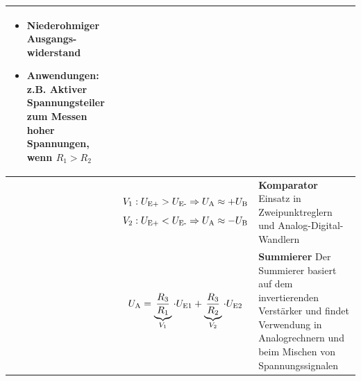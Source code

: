 \begin{table}[ht]
\begin{tabular}{|m{}|m{}|m{}|}
\begin{itemize}[leftmargin=0.4cm, parsep=0.0cm, itemsep=2pt, topsep=2pt]
            \item Niederohmiger Ausgangs-\linebreak widerstand
            \item Anwendungen: \linebreak z.B. Aktiver Spannungsteiler zum Messen hoher Spannungen, wenn $R_1 > R_2$
        \end{itemize}
        \\ %
        \hline
        \centering
        
                                                            &
        \begin{center}
            
            \[
                V_1: U_{\textnormal{E+}} > U_{\textnormal{E-}} \Rightarrow U_{\textnormal{A}} \approx +U_{\textnormal{B}}
            \]
            \[
                V_2: U_{\textnormal{E+}} < U_{\textnormal{E-}} \Rightarrow U_{\textnormal{A}} \approx -U_{\textnormal{B}}
            \]
        \end{center}
                                                            & 
        \textbf{Komparator}\newline
        \index{Operationsverstärker>Komparator}
        Einsatz in Zweipunktreglern und Analog-Digital-Wandlern
        \\ %
        \hline

        \centering
        

                                                            &
        \begin{center}
            
        \end{center}
        \vspace{1ex}
        \[
            \begin{aligned}
                U_{\textnormal{A}} = \underbrace{\frac{R_3} {R_1}}_{V_1} \cdot U_{\textnormal{E1}} + \underbrace{\frac{R_3} {R_2}}_{V_2} \cdot U_{\textnormal{E2}}
            \end{aligned}
        \]
                                                            &
        \textbf{Summierer}\newline
        \index{Operationsverstärker>Summierer}
        Der Summierer basiert auf dem invertierenden Verstärker und findet Verwendung in Analogrechnern und beim Mischen von Spannungssignalen
        \\ %
        \hline
    \end{tabular}
\end{table}


